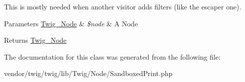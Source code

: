 This is mostly needed when another visitor adds filters (like the escaper one).


\begin{DoxyParams}[1]{Parameters}
\hyperlink{classTwig__Node}{Twig\+\_\+\+Node} & {\em \$node} & A Node\\
\hline
\end{DoxyParams}
\begin{DoxyReturn}{Returns}
\hyperlink{classTwig__Node}{Twig\+\_\+\+Node} 
\end{DoxyReturn}


The documentation for this class was generated from the following file\+:\begin{DoxyCompactItemize}
\item 
vendor/twig/twig/lib/\+Twig/\+Node/Sandboxed\+Print.\+php\end{DoxyCompactItemize}
